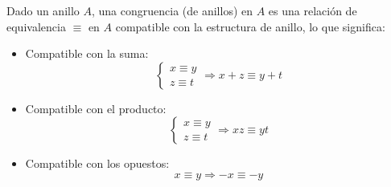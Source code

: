\begin{definition}[Congruencia]
    Dado un anillo $A$, una congruencia (de anillos) en $A$ es una relación de equivalencia $\equiv$ en $A$ compatible con la estructura de anillo, lo que significa:
    \begin{itemize}
        \item Compatible con la suma:
        \begin{equation*}
            \begin{cases}
            x \equiv y \\
            z \equiv t
            \end{cases}
            \Rightarrow x + z \equiv y + t
        \end{equation*}
        \item Compatible con el producto:
        \begin{equation*}
            \begin{cases}
            x \equiv y \\
            z \equiv t
            \end{cases}
            \Rightarrow xz \equiv yt
        \end{equation*}
        \item Compatible con los opuestos:
        \begin{equation*}
            x \equiv y \Rightarrow -x \equiv -y
        \end{equation*}
    \end{itemize}
\end{definition}

